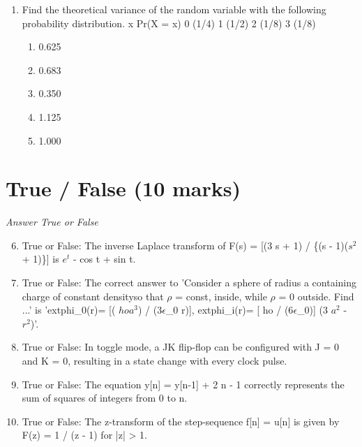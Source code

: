 \documentclass[12pt]{article}
\begin{document}
\begin{enumerate}[label=\arabic*.]
\begin{enumerate}[label=(\alph*)]
    \item Volt
    \item Weber
    \item Watt
    \item Ohm
    \item Joule
\end{enumerate}
\item Find the theoretical variance of the random variable with the following probability distribution. x Pr(X = x) 0 (1/4) 1 (1/2) 2 (1/8) 3 (1/8)
\begin{enumerate}[label=(\alph*)]
    \item 0.625
    \item 0.683
    \item 0.350
    \item 1.125
    \item 1.000
\end{enumerate}
\end{enumerate}

\section*{True / False (10 marks)}
\textit{Answer True or False}
\begin{enumerate}[label=\arabic*.]
\setcounter{enumi}{5}
\item True or False: The inverse Laplace transform of F(s) = [(3 s + 1) / \{(s - 1)($s^2$ + 1)\}] is $e^t$ - cos t + sin t.
\item True or False: The correct answer to 'Consider a sphere of radius a containing charge of constant densityso that \ensuremath{\rho} = const, inside, while \ensuremath{\rho} = 0 outside. Find \textphi...' is 'extphi\_0(r)= [( $hoa^3$) / (3\ensuremath{\epsilon}\_0 r)], extphi\_i(r)= [ ho / (6\ensuremath{\epsilon}\_0)] (3 $a^2$ - $r^2$)'.
\item True or False: In toggle mode, a JK flip-flop can be configured with J = 0 and K = 0, resulting in a state change with every clock pulse.
\item True or False: The equation y[n] = y[n-1] + 2 n - 1 correctly represents the sum of squares of integers from 0 to n.
\item True or False: The z-transform of the step-sequence f[n] = u[n] is given by F(z) = 1 / (z - 1) for |z| \textgreater{} 1.
\end{enumerate}
\end{document}
